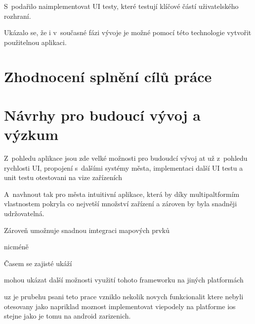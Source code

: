S~podařilo naimplementovat UI testy, které testují klíčové částí uživatelského rozhraní.

Ukázalo se, že i v~současné fázi vývoje je možné pomocí této technologie vytvořit použitelnou aplikaci.

\section{Zhodnocení splnění cílů práce}
\section{Návrhy pro budoucí vývoj a výzkum}
Z~pohledu aplikace jsou zde velké možnosti pro budoudcí vývoj 
at už z~pohledu rychlosti UI, propojení s~dalšími systémy města, implementaci další UI testu a unit testu
otestovani na vize zařízeních

A~navhnout tak pro města intuitivní aplikace, která by díky multipaltformím vlastnostem pokryla co nejvetší množství zařízení
a zároven by byla snadněji udržovatelná.

Zároveň umožnuje snadnou imtegraci mapových prvků 

nicméně 


Časem se zajisté ukáží

\bigskip

mohou ukázat další možnosti využití tohoto frameworku na jiných platformách

uz je prubehu psani teto prace vzniklo nekolik novych funkcionalit ktere nebyli otesovany jako napriklad moznost
implementovat viepodely na platforme ios stejne jako je tomu na android zarizenich.
